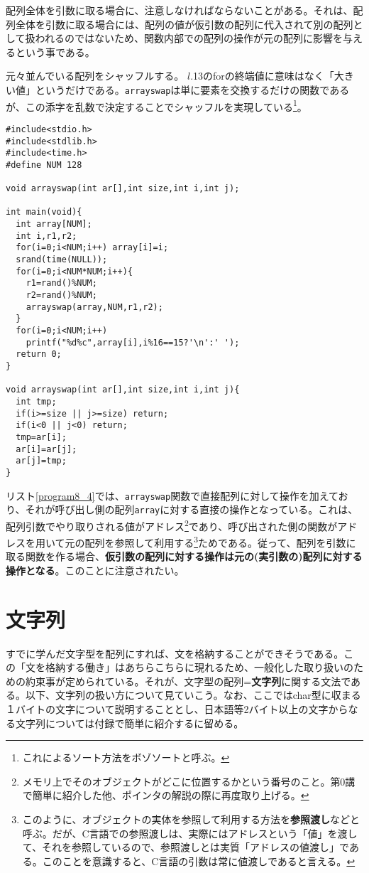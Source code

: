 配列全体を引数に取る場合に、注意しなければならないことがある。それは、配列全体を引数に取る場合には、配列の値が仮引数の配列に代入されて別の配列として扱われるのではないため、関数内部での配列の操作が元の配列に影響を与えるという事である。
\begin{boxnote}
元々並んでいる配列をシャッフルする。
$l$.13のforの終端値に意味はなく「大きい値」というだけである。\verb|arrayswap|は単に要素を交換するだけの関数であるが、この添字を乱数で決定することでシャッフルを実現している\footnote{これによるソート方法をボゾソートと呼ぶ。}。

\begin{lstlisting}[caption=配列のシャッフル,label=program8_4]
#include<stdio.h>
#include<stdlib.h>
#include<time.h>
#define NUM 128

void arrayswap(int ar[],int size,int i,int j);

int main(void){
  int array[NUM];
  int i,r1,r2;
  for(i=0;i<NUM;i++) array[i]=i;
  srand(time(NULL));
  for(i=0;i<NUM*NUM;i++){
    r1=rand()%NUM;
    r2=rand()%NUM;
    arrayswap(array,NUM,r1,r2);
  }
  for(i=0;i<NUM;i++)
    printf("%d%c",array[i],i%16==15?'\n':' ');
  return 0;
}

void arrayswap(int ar[],int size,int i,int j){
  int tmp;
  if(i>=size || j>=size) return;
  if(i<0 || j<0) return;
  tmp=ar[i];
  ar[i]=ar[j];
  ar[j]=tmp;
}
\end{lstlisting}
\end{boxnote}

リスト\ref{program8_4}では、\verb|arrayswap|関数で直接配列に対して操作を加えており、それが呼び出し側の配列\verb|array|に対する直接の操作となっている。これは、配列引数でやり取りされる値がアドレス\footnote{メモリ上でそのオブジェクトがどこに位置するかという番号のこと。第0講で簡単に紹介した他、ポインタの解説の際に再度取り上げる。}であり、呼び出された側の関数がアドレスを用いて元の配列を参照して利用する\footnote{このように、オブジェクトの実体を参照して利用する方法を\textbf{参照渡し}などと呼ぶ。だが、C言語での参照渡しは、実際にはアドレスという「値」を渡して、それを参照しているので、参照渡しとは実質「アドレスの値渡し」である。このことを意識すると、C言語の引数は常に値渡しであると言える。}ためである。従って、配列を引数に取る関数を作る場合、\textbf{仮引数の配列に対する操作は元の(実引数の)配列に対する操作となる}。このことに注意されたい。

\section{文字列}
すでに学んだ文字型を配列にすれば、文を格納することができそうである。この「文を格納する働き」はあちらこちらに現れるため、一般化した取り扱いのための約束事が定められている。それが、文字型の配列=\textbf{文字列}に関する文法である。以下、文字列の扱い方について見ていこう。なお、ここではchar型に収まる１バイトの文字について説明することとし、日本語等2バイト以上の文字からなる文字列については付録で簡単に紹介するに留める。

